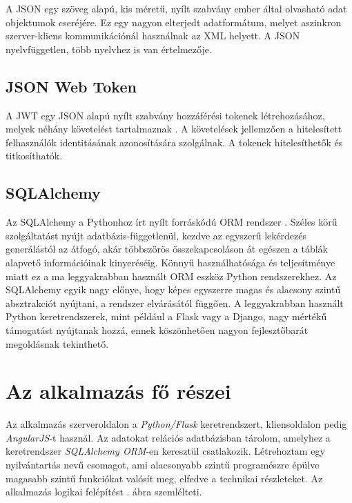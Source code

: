 A JSON egy szöveg alapú, kis méretű, nyílt szabvány ember által olvasható adat objektumok cseréjére. Ez egy nagyon elterjedt adatformátum, melyet aszinkron szerver-kliens kommunikációnál használnak az XML helyett. A JSON nyelvfüggetlen, több nyelvhez is van értelmezője.

\subsection{JSON Web Token}
A JWT egy JSON alapú nyílt szabvány hozzáférési tokenek létrehozásához, melyek néhány követelést tartalmaznak \cite{jwt}. A követelések jellemzően a hitelesített felhasználók identitásának azonosítására szolgálnak. A tokenek hitelesíthetők és titkosíthatók.

\subsection{SQLAlchemy}

Az SQLAlchemy a Pythonhoz írt nyílt forráskódú ORM rendszer \cite{sqlalchemy}. Széles körű szolgáltatást nyújt adatbázis-függetlenül, kezdve az egyszerű lekérdezés generálástól az átfogó, akár többszörös összekapcsoláson át egészen a táblák alapvető információinak kinyeréséig. Könnyű használhatósága és teljesítménye miatt ez a ma leggyakrabban használt ORM eszköz Python rendszerekhez. 
Az SQLAlchemy egyik nagy előnye, hogy képes egyszerre magas és alacsony szintű absztrakciót nyújtani, a rendszer elvárásától függően. A leggyakrabban használt Python keretrendszerek, mint például a Flask vagy a Django, nagy mértékű támogatást nyújtanak hozzá, ennek köszönhetően nagyon fejlesztőbarát megoldásnak tekinthető.

\section{Az alkalmazás fő részei}

Az alkalmazás szerveroldalon a \textit{Python/Flask} keretrendszert, kliensoldalon pedig \textit{AngularJS}-t használ. Az adatokat relációs adatbázisban tárolom, amelyhez a keretrendszer \textit{SQLAlchemy ORM}-en keresztül csatlakozik. Létrehoztam egy nyilvántartás nevű csomagot, ami alacsonyabb szintű programészre épülve magasabb szintű funkciókat valósít meg, elfedve a technikai részleteket. Az alkalmazás logikai felépítést . ábra szemlélteti.

